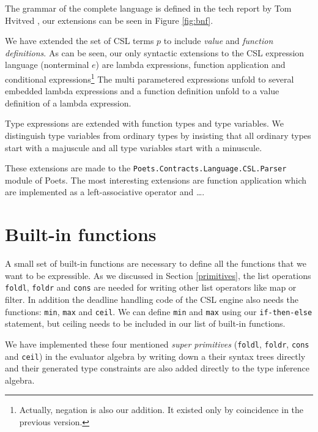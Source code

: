 \documentclass[10pt,a4paper,final,oneside,openany,article]{memoir}
\begin{document}
The grammar of the complete language is defined in the tech report by
Tom Hvitved \cite[page 13, Figure 1]{hvitved10}, our extensions can be seen in
Figure \ref{fig:bnf}. 

We have extended the set of CSL terms $p$ to include \textit{value}
and \textit{function definitions}.  As can be seen, our only syntactic
extensions to the CSL expression language (nonterminal $e$) are lambda
expressions, function application and conditional
expressions\footnote{Actually, negation is also our addition. It
  existed only by coincidence in the previous version.} %
The multi
parametered expressions unfold to several embedded lambda expressions
and a function definition unfold to a value definition of a lambda
expression.

Type expressions are extended with function types and type
variables. We distinguish type variables from ordinary types by
insisting that all ordinary types start with a majuscule and all type
variables start with a minuscule.

These extensions are made to the
\texttt{Poets.Contracts.Language.CSL.Parser} module of Poets. The most
interesting extensions are function application which are implemented
as a left-associative operator and \ldots.  

\section{Built-in functions}
A small set of built-in functions are necessary to define all the
functions that we want to be expressible. As we discussed in Section
\ref{primitives}, the list operations \lstinline{foldl},
\lstinline{foldr} and \lstinline{cons} are needed for writing other
list operators like map or filter. In addition the deadline handling
code of the CSL engine also needs the functions: \lstinline{min},
\lstinline{max} and \lstinline{ceil}. We can define \lstinline{min}
and \lstinline{max} using our \lstinline{if-then-else} statement, but
ceiling needs to be included in our list of built-in functions.

We have implemented these four mentioned \textit{super primitives}
(\lstinline{foldl}, \lstinline{foldr}, \lstinline{cons} and
\lstinline{ceil}) in the evaluator algebra by writing down a their
syntax trees directly and their generated type constraints are also
added directly to the type inference algebra.
\end{document}

